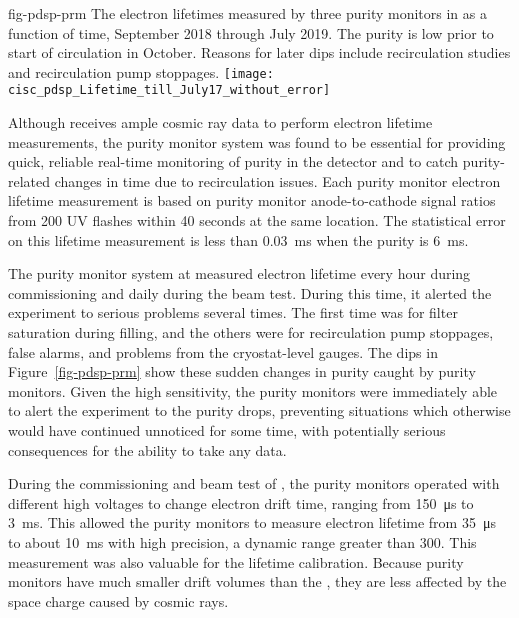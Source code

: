 \begin{dunefigure}{fig-pdsp-prm}
  {The electron lifetimes measured by three purity monitors in  as a function of time, September 2018 through July 2019. The purity is low prior to start of circulation in October. Reasons for later dips include recirculation studies and recirculation pump stoppages.}
  \texttt{[image: cisc\_pdsp\_Lifetime\_till\_July17\_without\_error]}
\end{dunefigure}

Although  receives ample cosmic ray data to perform electron lifetime measurements, the purity monitor system was found to be essential for providing quick, reliable real-time monitoring of purity in the detector and to catch purity-related changes in time due to  recirculation issues. 
Each purity monitor electron lifetime measurement is based on purity monitor anode-to-cathode signal ratios from 200 UV flashes within 40 seconds at the same location. The statistical error on this lifetime measurement is less than \SI{0.03}{ms} when the purity is \SI{6}{ms}. 

The purity monitor system at  measured electron lifetime every hour during commissioning and daily during the beam test. During 
this time, it alerted the experiment to serious problems several times. 
 The first time was for filter saturation during  filling, and the others were for recirculation pump stoppages, false alarms, and problems from the cryostat-level gauges.  The dips in Figure~\ref{fig-pdsp-prm} show these sudden changes in purity caught by purity monitors. 
Given the high sensitivity, the  purity monitors  were immediately able to alert the experiment to the purity drops, 
preventing situations which otherwise would have continued unnoticed for some time, with potentially serious consequences for the ability to take any data. 

During the commissioning and beam test of , the purity monitors operated with different high voltages to change electron drift time, ranging from \SI{150}{\micro\second} to \SI{3}{\milli\second}. This allowed the  purity monitors to measure electron lifetime from \SI{35}{\micro\second} to about \SI{10}{\milli\second} with high precision, a dynamic range greater than \num{300}. 
This measurement was also valuable for the  lifetime calibration. Because purity monitors have much smaller drift volumes than the , they are less affected by the space charge caused by cosmic rays. 

